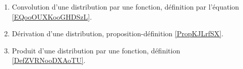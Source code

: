 
\begin{enumerate}
    \item
        Convolution d'une distribution par une fonction, définition par l'équation \eqref{EQooOUXKooGHDSzL}.
    \item
        Dérivation d'une distribution, proposition-définition \ref{PropKJLrfSX}.
    \item
        Produit d'une distribution par une fonction, définition \ref{DefZVRNooDXAoTU}.
\end{enumerate}

